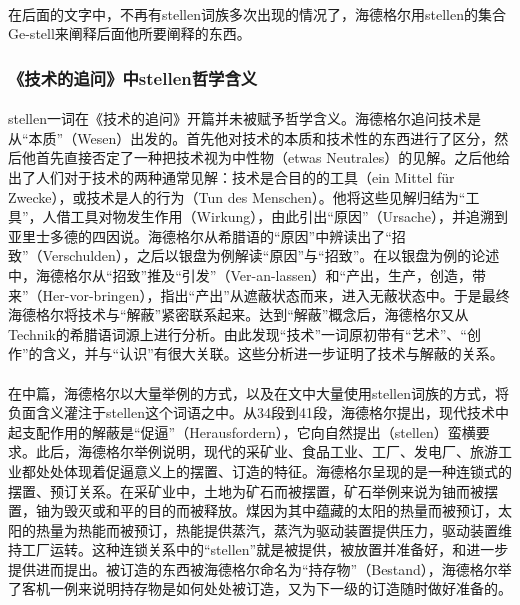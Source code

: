 \documentclass{article}
\begin{document}
			\paragraph{}
		在后面的文字中，不再有stellen词族多次出现的情况了，海德格尔用stellen的集合Ge-stell来阐释后面他所要阐释的东西。
		\subsubsection{《技术的追问》中stellen哲学含义}
			\paragraph{}
		stellen一词在《技术的追问》开篇并未被赋予哲学含义。海德格尔追问技术是从“本质”（Wesen）出发的。首先他对技术的本质和技术性的东西进行了区分，然后他首先直接否定了一种把技术视为中性物（etwas Neutrales）的见解。之后他给出了人们对于技术的两种通常见解：技术是合目的的工具（ein Mittel für Zwecke），或技术是人的行为（Tun des Menschen）。他将这些见解归结为“工具”，人借工具对物发生作用（Wirkung），由此引出“原因”（Ursache），并追溯到亚里士多德的四因说。海德格尔从希腊语的“原因”中辨读出了“招致”（Verschulden），之后以银盘为例解读“原因”与“招致”。在以银盘为例的论述中，海德格尔从“招致”推及“引发”（Ver-an-lassen）和“产出，生产，创造，带来”（Her-vor-bringen），指出“产出”从遮蔽状态而来，进入无蔽状态中。于是最终海德格尔将技术与“解蔽”紧密联系起来。达到“解蔽”概念后，海德格尔又从Technik的希腊语词源上进行分析。由此发现“技术”一词原初带有“艺术”、“创作”的含义，并与“认识”有很大关联。这些分析进一步证明了技术与解蔽的关系。
			\paragraph{}
		在中篇，海德格尔以大量举例的方式，以及在文中大量使用stellen词族的方式，将负面含义灌注于stellen这个词语之中。从34段到41段，海德格尔提出，现代技术中起支配作用的解蔽是“促逼”（Herausfordern），它向自然提出（stellen）蛮横要求。此后，海德格尔举例说明，现代的采矿业、食品工业、工厂、发电厂、旅游工业都处处体现着促逼意义上的摆置、订造的特征。海德格尔呈现的是一种连锁式的摆置、预订关系。在采矿业中，土地为矿石而被摆置，矿石举例来说为铀而被摆置，铀为毁灭或和平的目的而被释放。煤因为其中蕴藏的太阳的热量而被预订，太阳的热量为热能而被预订，热能提供蒸汽，蒸汽为驱动装置提供压力，驱动装置维持工厂运转。这种连锁关系中的“stellen”就是被提供，被放置并准备好，和进一步提供进而提出。被订造的东西被海德格尔命名为“持存物”（Bestand），海德格尔举了客机一例来说明持存物是如何处处被订造，又为下一级的订造随时做好准备的。
\end{document}
